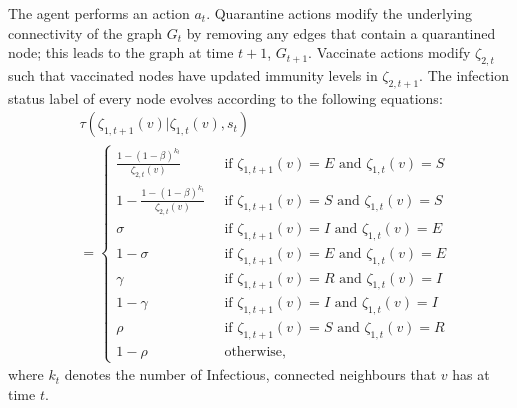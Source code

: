 The agent performs an action $a_t$. Quarantine actions modify the underlying connectivity of the graph $G_t$ by removing any edges that contain a quarantined node; this leads to the graph at time $t+1$, $G_{t+1}$. Vaccinate actions modify $\zeta_{2, t}$ such that vaccinated nodes have updated immunity levels in $\zeta_{2, t+1}$. The infection status label of every node evolves according to the following equations:
\begin{equation}
\begin{split}
&\tau(\zeta_{1, {t+1}}(v) | \zeta_{1, t}(v), s_t ) \\
&= 
\begin{cases}
    \frac{1 - (1 - \beta)^{k_t}}{\zeta_{2, t}(v)} \;\; & \text{if } \zeta_{1, {t+1}}(v) = E \text{ and }\zeta_{1, t}(v) = S\\
    1 - \frac{1 - (1 - \beta)^{k_t}}{\zeta_{2, t}(v)} \;\; & \text{if } \zeta_{1, {t+1}}(v) = S \text{ and }\zeta_{1, t}(v) = S\\
    \sigma \;\; & \text{if } \zeta_{1, {t+1}}(v) = I \text{ and }\zeta_{1, t}(v) = E\\
    1 - \sigma \;\; & \text{if } \zeta_{1, {t+1}}(v) = E \text{ and }\zeta_{1, t}(v) = E\\
    \gamma \;\; & \text{if } \zeta_{1, {t+1}}(v) = R \text{ and }\zeta_{1, t}(v) = I\\
    1 - \gamma \;\; & \text{if } \zeta_{1, {t+1}}(v) = I \text{ and }\zeta_{1, t}(v) = I\\ 
    \rho \;\; & \text{if } \zeta_{1, {t+1}}(v) = S \text{ and }\zeta_{1, t}(v) = R\\
    1 - \rho \;\; & \text{otherwise,}
\end{cases}
\label{eqn:SEIRS_transition}
\end{split}
\end{equation}
where $k_t$ denotes the number of Infectious, connected neighbours that $v$ has at time $t$.

